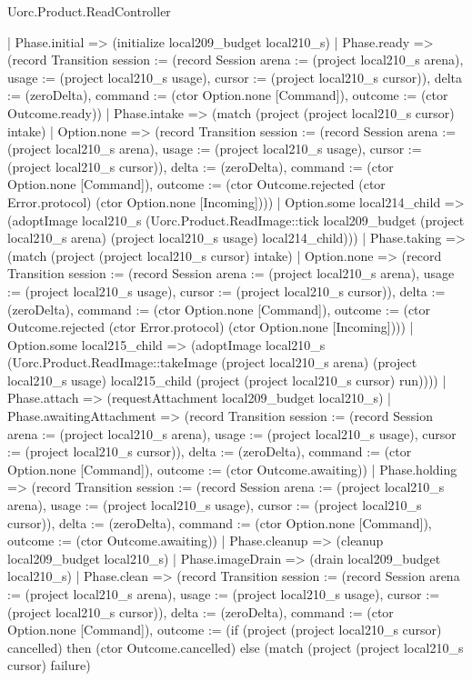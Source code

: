 \begin{lexlean}{Uorc.Product.ReadController}
\begin{semanticmodule}
{    | Phase.initial => (initialize local209_budget local210_s)
    | Phase.ready => (record Transition {session := (record Session {arena := (project local210_s arena), usage := (project local210_s usage), cursor := (project local210_s cursor)}), delta := (zeroDelta), command := (ctor Option.none [Command]), outcome := (ctor Outcome.ready)})
    | Phase.intake => (match (project (project local210_s cursor) intake)
      | Option.none => (record Transition {session := (record Session {arena := (project local210_s arena), usage := (project local210_s usage), cursor := (project local210_s cursor)}), delta := (zeroDelta), command := (ctor Option.none [Command]), outcome := (ctor Outcome.rejected (ctor Error.protocol) (ctor Option.none [Incoming]))})
      | Option.some local214_child => (adoptImage local210_s (Uorc.Product.ReadImage::tick local209_budget (project local210_s arena) (project local210_s usage) local214_child)))
    | Phase.taking => (match (project (project local210_s cursor) intake)
      | Option.none => (record Transition {session := (record Session {arena := (project local210_s arena), usage := (project local210_s usage), cursor := (project local210_s cursor)}), delta := (zeroDelta), command := (ctor Option.none [Command]), outcome := (ctor Outcome.rejected (ctor Error.protocol) (ctor Option.none [Incoming]))})
      | Option.some local215_child => (adoptImage local210_s (Uorc.Product.ReadImage::takeImage (project local210_s arena) (project local210_s usage) local215_child (project (project local210_s cursor) run))))
    | Phase.attach => (requestAttachment local209_budget local210_s)
    | Phase.awaitingAttachment => (record Transition {session := (record Session {arena := (project local210_s arena), usage := (project local210_s usage), cursor := (project local210_s cursor)}), delta := (zeroDelta), command := (ctor Option.none [Command]), outcome := (ctor Outcome.awaiting)})
    | Phase.holding => (record Transition {session := (record Session {arena := (project local210_s arena), usage := (project local210_s usage), cursor := (project local210_s cursor)}), delta := (zeroDelta), command := (ctor Option.none [Command]), outcome := (ctor Outcome.awaiting)})
    | Phase.cleanup => (cleanup local209_budget local210_s)
    | Phase.imageDrain => (drain local209_budget local210_s)
    | Phase.clean => (record Transition {session := (record Session {arena := (project local210_s arena), usage := (project local210_s usage), cursor := (project local210_s cursor)}), delta := (zeroDelta), command := (ctor Option.none [Command]), outcome := (if (project (project local210_s cursor) cancelled) then (ctor Outcome.cancelled) else (match (project (project local210_s cursor) failure)
}}
\end{semanticmodule}
\end{lexlean}
